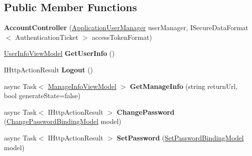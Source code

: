\subsection*{Public Member Functions}
\begin{DoxyCompactItemize}
\item 
\hypertarget{class_wis_r_rest_a_p_i_1_1_controllers_1_1_account_controller_a082ead186bdd26c07603bf94b928cc99}{}{\bfseries Account\+Controller} (\hyperlink{class_wis_r_rest_a_p_i_1_1_application_user_manager}{Application\+User\+Manager} user\+Manager, I\+Secure\+Data\+Format$<$ Authentication\+Ticket $>$ access\+Token\+Format)\label{class_wis_r_rest_a_p_i_1_1_controllers_1_1_account_controller_a082ead186bdd26c07603bf94b928cc99}

\item 
\hypertarget{class_wis_r_rest_a_p_i_1_1_controllers_1_1_account_controller_a0a96293736b5ba79ed445c9d08dae561}{}\hyperlink{class_wis_r_rest_a_p_i_1_1_models_1_1_user_info_view_model}{User\+Info\+View\+Model} {\bfseries Get\+User\+Info} ()\label{class_wis_r_rest_a_p_i_1_1_controllers_1_1_account_controller_a0a96293736b5ba79ed445c9d08dae561}

\item 
\hypertarget{class_wis_r_rest_a_p_i_1_1_controllers_1_1_account_controller_a28b7a6e30e4eba58290adf38601e74ac}{}I\+Http\+Action\+Result {\bfseries Logout} ()\label{class_wis_r_rest_a_p_i_1_1_controllers_1_1_account_controller_a28b7a6e30e4eba58290adf38601e74ac}

\item 
\hypertarget{class_wis_r_rest_a_p_i_1_1_controllers_1_1_account_controller_a16b33d8eed4a3d70594d854b35f38ee0}{}async Task$<$ \hyperlink{class_wis_r_rest_a_p_i_1_1_models_1_1_manage_info_view_model}{Manage\+Info\+View\+Model} $>$ {\bfseries Get\+Manage\+Info} (string return\+Url, bool generate\+State=false)\label{class_wis_r_rest_a_p_i_1_1_controllers_1_1_account_controller_a16b33d8eed4a3d70594d854b35f38ee0}

\item 
\hypertarget{class_wis_r_rest_a_p_i_1_1_controllers_1_1_account_controller_af489f77298e48ee8f278d38e7ce80442}{}async Task$<$ I\+Http\+Action\+Result $>$ {\bfseries Change\+Password} (\hyperlink{class_wis_r_rest_a_p_i_1_1_models_1_1_change_password_binding_model}{Change\+Password\+Binding\+Model} model)\label{class_wis_r_rest_a_p_i_1_1_controllers_1_1_account_controller_af489f77298e48ee8f278d38e7ce80442}

\item 
\hypertarget{class_wis_r_rest_a_p_i_1_1_controllers_1_1_account_controller_ae8ed233535c23dc29f26e513b852ba1a}{}async Task$<$ I\+Http\+Action\+Result $>$ {\bfseries Set\+Password} (\hyperlink{class_wis_r_rest_a_p_i_1_1_models_1_1_set_password_binding_model}{Set\+Password\+Binding\+Model} model)\label{class_wis_r_rest_a_p_i_1_1_controllers_1_1_account_controller_ae8ed233535c23dc29f26e513b852ba1a}


\end{DoxyCompactItemize}
